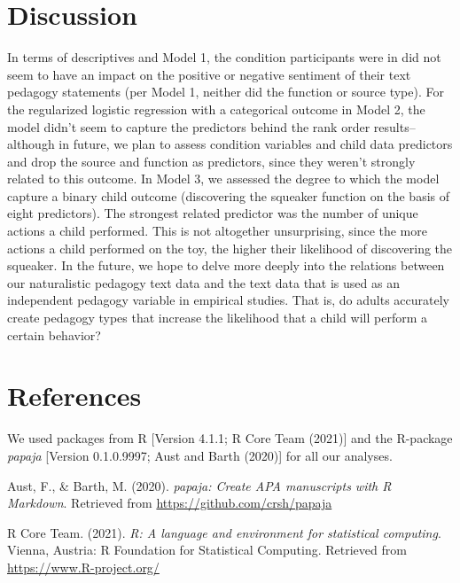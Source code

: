 \documentclass[
  english,
  man]{apa6}
\newlength{\cslhangindent}
\newlength{\cslentryspacingunit} %
\newenvironment{CSLReferences}[2] %
 {%
  \setlength{\parindent}{0pt}
  \ifodd #1
  \let\oldpar\par
  \def\par{\hangindent=\cslhangindent\oldpar}
  \fi
  \setlength{\parskip}{#2\cslentryspacingunit}
 }%
 {}
\begin{document}
\hypertarget{discussion}{%
\section{Discussion}\label{discussion}}

In terms of descriptives and Model 1, the condition participants were in did not
seem to have an impact on the positive or negative sentiment of their text pedagogy
statements (per Model 1, neither did the function or source type). For the
regularized logistic regression with a categorical outcome in Model 2, the model
didn't seem to capture the predictors behind the rank order results--although in
future, we plan to assess condition variables and child data predictors and drop the
source and function as predictors, since they weren't strongly related to this
outcome. In Model 3, we assessed the degree to which the model capture a binary
child outcome (discovering the squeaker function on the basis of eight predictors).
The strongest related predictor was the number of unique actions a child performed.
This is not altogether unsurprising, since the more actions a child performed on the
toy, the higher their likelihood of discovering the squeaker. In the future, we hope
to delve more deeply into the relations between our naturalistic pedagogy text data
and the text data that is used as an independent pedagogy variable in empirical
studies. That is, do adults accurately create pedagogy types that increase the
likelihood that a child will perform a certain behavior?

\newpage

\hypertarget{references}{%
\section{References}\label{references}}

We used packages from R {[}Version 4.1.1; R Core Team (2021){]} and the R-package \emph{papaja} {[}Version 0.1.0.9997; Aust and Barth (2020){]} for all our analyses.

\begingroup
\setlength{\parindent}{-0.5in}
\setlength{\leftskip}{0.5in}

\hypertarget{refs}{}
\begin{CSLReferences}{1}{0}
\leavevmode{}%
Aust, F., \& Barth, M. (2020). \emph{{papaja}: {Create} {APA} manuscripts with {R Markdown}}. Retrieved from \url{https://github.com/crsh/papaja}

\leavevmode{}%
R Core Team. (2021). \emph{R: A language and environment for statistical computing}. Vienna, Austria: R Foundation for Statistical Computing. Retrieved from \url{https://www.R-project.org/}

\end{CSLReferences}

\endgroup
\end{document}
